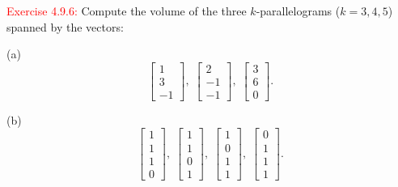 \documentclass[12pt]{article}
\begin{document}
\textcolor{red}{Exercise 4.9.6:}
Compute the volume of the three $k$-parallelograms ($k=3,4,5$) spanned by the vectors:

(a)
\begin{equation*}
    \begin{bmatrix}
    1\\3\\-1
    \end{bmatrix} , \;
        \begin{bmatrix}
    2\\-1\\-1
    \end{bmatrix} , \;
        \begin{bmatrix}
    3\\6\\0
    \end{bmatrix} .
\end{equation*}

(b)
\begin{equation*}
    \begin{bmatrix}
    1\\1\\1\\0
    \end{bmatrix} , \;
    \begin{bmatrix}
    1\\1\\0\\1
    \end{bmatrix} , \;
        \begin{bmatrix}
    1\\0\\1\\1
    \end{bmatrix} , \;
        \begin{bmatrix}
    0\\1\\1\\1
    \end{bmatrix} .
\end{equation*}
\end{document}
